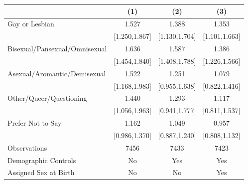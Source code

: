 \begin{tabular}{lccc}
\toprule
                    &\multicolumn{1}{c}{(1)}         &\multicolumn{1}{c}{(2)}         &\multicolumn{1}{c}{(3)}         \\
\midrule
 Gay or Lesbian&                 1.527\sym{***}&                 1.388\sym{***}&                 1.353\sym{***}\\
                    &         [1.250,1.867]         &         [1.130,1.704]         &         [1.101,1.663]         \\
\addlinespace
 Bisexual/Pansexual/Omnisexual&                 1.636\sym{***}&                 1.587\sym{***}&                 1.386\sym{***}\\
                    &         [1.454,1.840]         &         [1.408,1.788]         &         [1.226,1.566]         \\
\addlinespace
 Asexual/Aromantic/Demisexual&                 1.522\sym{***}&                 1.251         &                 1.079         \\
                    &         [1.168,1.983]         &         [0.955,1.638]         &         [0.822,1.416]         \\
\addlinespace
 Other/Queer/Questioning&                 1.440\sym{**} &                 1.293         &                 1.117         \\
                    &         [1.056,1.963]         &         [0.941,1.777]         &         [0.811,1.537]         \\
\addlinespace
 Prefer Not to Say&                 1.162\sym{*}  &                 1.049         &                 0.957         \\
                    &         [0.986,1.370]         &         [0.887,1.240]         &         [0.808,1.132]         \\
\midrule
Observations        &                  7456         &                  7433         &                  7423         \\
Demographic Controls&                    No         &                   Yes         &                   Yes         \\
Assigned Sex at Birth&                    No         &                    No         &                   Yes         \\
\bottomrule
\end{tabular}

